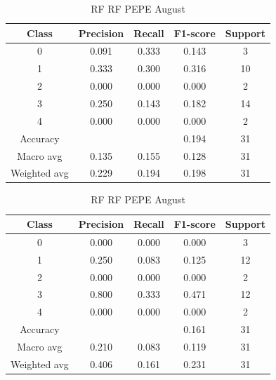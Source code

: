\begin{enumerate}
\begin{enumerate}
                \begin{table}[H]
                \centering
                \scriptsize
                \begin{minipage}{0.48\textwidth}
                \centering
                \begin{tabular}{c|cccc}
                \hline
                Class & Precision & Recall & F1-score & Support \\
                \hline
                0 & 0.091 & 0.333 & 0.143 & 3 \\
                1 & 0.333 & 0.300 & 0.316 & 10 \\
                2 & 0.000 & 0.000 & 0.000 & 2 \\
                3 & 0.250 & 0.143 & 0.182 & 14 \\
                4 & 0.000 & 0.000 & 0.000 & 2 \\
                \hline
                Accuracy &       &      & 0.194 & 31 \\
                Macro avg & 0.135 & 0.155 & 0.128 & 31 \\
                Weighted avg & 0.229 & 0.194 & 0.198 & 31 \\
                \hline
                \end{tabular}
                \caption{RF RF DOGE August}
                \label{tab:classifier_2_report_rf_rf_doge_filtered_aug}
                \end{minipage}%
                \hfill
                \begin{minipage}{0.48\textwidth}
                \centering
                \begin{tabular}{c|cccc}
                \hline
                Class & Precision & Recall & F1-score & Support \\
                \hline
                0 & 0.000 & 0.000 & 0.000 & 3 \\
                1 & 0.250 & 0.083 & 0.125 & 12 \\
                2 & 0.000 & 0.000 & 0.000 & 2 \\
                3 & 0.800 & 0.333 & 0.471 & 12 \\
                4 & 0.000 & 0.000 & 0.000 & 2 \\
                \hline
                Accuracy &       &      & 0.161 & 31 \\
                Macro avg & 0.210 & 0.083 & 0.119 & 31 \\
                Weighted avg & 0.406 & 0.161 & 0.231 & 31 \\
                \hline
                \end{tabular}
                \caption{RF RF PEPE August}
                \label{tab:classifier_2_report_rf_rf_pepe_filtered_aug}
                \end{minipage}
                

\end{table}
\end{enumerate}
\end{enumerate}
